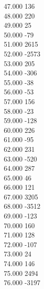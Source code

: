 { 47.000	136 \\
 48.000	220 \\
 49.000	25 \\
 50.000	-79 \\
 51.000	2615 \\
 52.000	-2573 \\
 53.000	205 \\
 54.000	-306 \\
 55.000	-38 \\
 56.000	-53 \\
 57.000	156 \\
 58.000	-23 \\
 59.000	-128 \\
 60.000	226 \\
 61.000	-95 \\
 62.000	231 \\
 63.000	-520 \\
 64.000	287 \\
 65.000	46 \\
 66.000	121 \\
 67.000	3205 \\
 68.000	-3512 \\
 69.000	-123 \\
 70.000	160 \\
 71.000	128 \\
 72.000	-107 \\
 73.000	24 \\
 74.000	146 \\
 75.000	2494 \\
 76.000	-3197 \\
}
